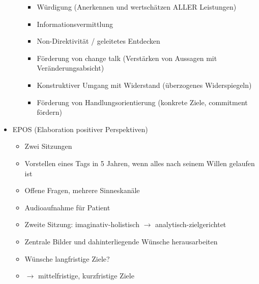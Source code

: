 \documentclass[11pt, paper=a4, twocolumn]{scrartcl}
\begin{document}
\begin{itemize}
\begin{itemize}
\begin{itemize}
							\item Würdigung (Anerkennen und wertschätzen ALLER Leistungen)
							\item Informationsvermittlung
							\item Non-Direktivität / geleitetes Entdecken
							\item Förderung von change talk (Verstärken von Aussagen mit Veränderungsabsicht)
							\item Konstruktiver Umgang mit Widerstand (überzogenes Widerspiegeln)
							\item Förderung von Handlungsorientierung (konkrete Ziele, commitment fördern)
						\end{itemize}
				\end{itemize}
			\item EPOS (Elaboration positiver Perspektiven)
				\begin{itemize}
					\item Zwei Sitzungen
					\item Vorstellen eines Tags in 5 Jahren, wenn alles nach seinem Willen gelaufen ist
					\item Offene Fragen, mehrere Sinneskanäle
					\item Audioaufnahme für Patient
					\item Zweite Sitzung: imaginativ-holistisch $\rightarrow$ analytisch-zielgerichtet
					\item Zentrale Bilder und dahinterliegende Wünsche herausarbeiten
					\item Wünsche langfristige Ziele?
					\item $\rightarrow$ mittelfristige, kurzfristige Ziele
				\end{itemize}
		\end{itemize}
\end{document}
